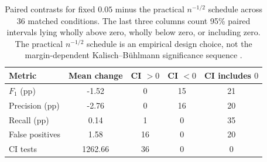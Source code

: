 \begin{table}[t]
\centering
\small
\renewcommand{\arraystretch}{1.13}
\setlength{\tabcolsep}{5pt}
\begin{tabularx}{\textwidth}{@{}L{1.65}C{0.95}C{0.80}C{0.80}C{0.80}@{}}
\toprule
Metric & Mean change & CI $>0$ & CI $<0$ & CI includes $0$ \\
\midrule
$F_1$ (pp) & -1.52 & 0 & 15 & 21 \\
Precision (pp) & -2.76 & 0 & 16 & 20 \\
Recall (pp) & 0.14 & 1 & 0 & 35 \\
False positives & 1.58 & 16 & 0 & 20 \\
CI tests & 1262.66 & 36 & 0 & 0 \\
\bottomrule
\end{tabularx}
\caption{Paired contrasts for fixed $0.05$ minus the practical $n^{-1/2}$ schedule across 36 matched conditions. The last three columns count 95\% paired intervals lying wholly above zero, wholly below zero, or including zero. The practical $n^{-1/2}$ schedule is an empirical design choice, not the margin-dependent Kalisch--B\"uhlmann significance sequence \citep{kalisch2007estimating}.}
\label{tab:alpha-summary}
\end{table}
